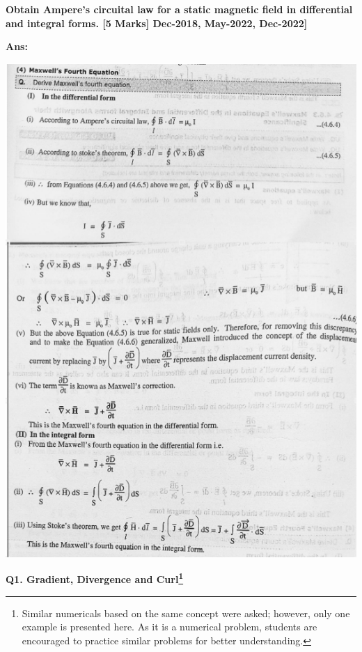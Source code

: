 \documentclass{exam}
\begin{document}
\begin{questions}
\newpage

\question \textbf{Obtain Ampere’s circuital law for a static magnetic field in differential and integral forms.  \hfil [5 Marks] Dec-2018, May-2022, Dec-2022] }

\textbf{Ans:}
\begin{center}
	\includegraphics[scale=0.545]{Q3.png} 
\end{center}

\end{questions}

\begin{center} \textbf{ \Large Q1. Gradient, Divergence and Curl\footnote{Similar numericals based on the same concept were asked; however, only one example is presented here. As it is a numerical problem, students are encouraged to practice similar problems for better understanding.}} \end{center}
\end{document}
